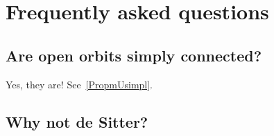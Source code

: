 %
\section{Frequently asked questions}
%

\subsection{Are open orbits simply connected?}

Yes, they are! See~\ref{PropmUsimpl}.

\subsection{Why not de Sitter?}
